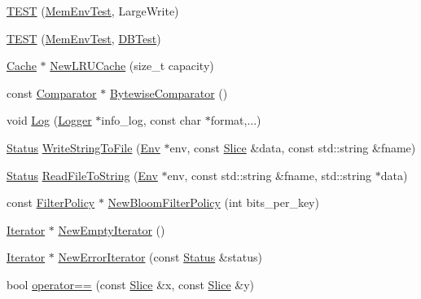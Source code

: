 \begin{DoxyCompactItemize}
\item 
\hyperlink{namespaceleveldb_a0af1e0377067cb2229d2ac1f66851040}{T\-E\-S\-T} (\hyperlink{classleveldb_1_1_mem_env_test}{Mem\-Env\-Test}, Large\-Write)
\item 
\hyperlink{namespaceleveldb_a2f341cbac955029d39ecb25107434a0c}{T\-E\-S\-T} (\hyperlink{classleveldb_1_1_mem_env_test}{Mem\-Env\-Test}, \hyperlink{classleveldb_1_1_d_b_test}{D\-B\-Test})
\item 
\hyperlink{classleveldb_1_1_cache}{Cache} $\ast$ \hyperlink{namespaceleveldb_a231e1b41322a8b342c91a15a78e425d4}{New\-L\-R\-U\-Cache} (size\-\_\-t capacity)
\item 
const \hyperlink{structleveldb_1_1_comparator}{Comparator} $\ast$ \hyperlink{namespaceleveldb_acd67740962c806afe8f4098cb153d25c}{Bytewise\-Comparator} ()
\item 
void \hyperlink{namespaceleveldb_aeba9623ceee38be99bed2bc1ae082954}{Log} (\hyperlink{classleveldb_1_1_logger}{Logger} $\ast$info\-\_\-log, const char $\ast$format,...)
\item 
\hyperlink{classleveldb_1_1_status}{Status} \hyperlink{namespaceleveldb_ae01563eb18a8527096b54d60251351cb}{Write\-String\-To\-File} (\hyperlink{classleveldb_1_1_env}{Env} $\ast$env, const \hyperlink{classleveldb_1_1_slice}{Slice} \&data, const std\-::string \&fname)
\item 
\hyperlink{classleveldb_1_1_status}{Status} \hyperlink{namespaceleveldb_aa47a20ae782e9ad537692c3202cd652d}{Read\-File\-To\-String} (\hyperlink{classleveldb_1_1_env}{Env} $\ast$env, const std\-::string \&fname, std\-::string $\ast$data)
\item 
const \hyperlink{classleveldb_1_1_filter_policy}{Filter\-Policy} $\ast$ \hyperlink{namespaceleveldb_ae6b34bf2331983721554f284b1eaa1a1}{New\-Bloom\-Filter\-Policy} (int bits\-\_\-per\-\_\-key)
\item 
\hyperlink{classleveldb_1_1_iterator}{Iterator} $\ast$ \hyperlink{namespaceleveldb_a3293c30e4a309a7293598b1db0f3e687}{New\-Empty\-Iterator} ()
\item 
\hyperlink{classleveldb_1_1_iterator}{Iterator} $\ast$ \hyperlink{namespaceleveldb_ab2c425a5fcb13b97e50e32c7b93186f5}{New\-Error\-Iterator} (const \hyperlink{classleveldb_1_1_status}{Status} \&status)
\item 
bool \hyperlink{namespaceleveldb_a53c443def2386ea299281cf36de3ae4b}{operator==} (const \hyperlink{classleveldb_1_1_slice}{Slice} \&x, const \hyperlink{classleveldb_1_1_slice}{Slice} \&y)
\item 

\end{DoxyCompactItemize}
